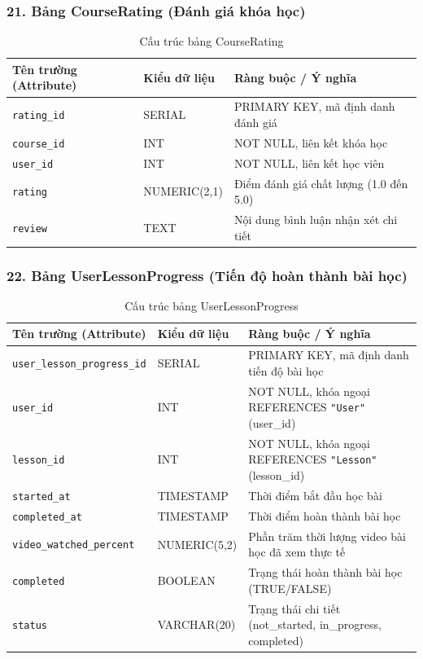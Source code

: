 \documentclass[../DoAn.tex]{subfiles}
\begin{document}
\subsubsection*{21. Bảng CourseRating (Đánh giá khóa học)}
\begin{table}[H]
\centering
\footnotesize
\renewcommand{\arraystretch}{1.2}
\begin{tabular}{|p{4.2cm}|p{3.2cm}|p{7.1cm}|}
\hline
\textbf{Tên trường (Attribute)} & \textbf{Kiểu dữ liệu} & \textbf{Ràng buộc / Ý nghĩa} \\
\hline
\texttt{rating\_id} & SERIAL & PRIMARY KEY, mã định danh đánh giá \\
\hline
\texttt{course\_id} & INT & NOT NULL, liên kết khóa học \\
\hline
\texttt{user\_id} & INT & NOT NULL, liên kết học viên \\
\hline
\texttt{rating} & NUMERIC(2,1) & Điểm đánh giá chất lượng (1.0 đến 5.0) \\
\hline
\texttt{review} & TEXT & Nội dung bình luận nhận xét chi tiết \\
\hline
\end{tabular}
\caption{Cấu trúc bảng CourseRating}
\label{tab:schema_courserating}
\end{table}

\subsubsection*{22. Bảng UserLessonProgress (Tiến độ hoàn thành bài học)}
\begin{table}[H]
\centering
\footnotesize
\renewcommand{\arraystretch}{1.2}
\begin{tabular}{|p{4.2cm}|p{3.2cm}|p{7.1cm}|}
\hline
\textbf{Tên trường (Attribute)} & \textbf{Kiểu dữ liệu} & \textbf{Ràng buộc / Ý nghĩa} \\
\hline
\texttt{user\_lesson\_progress\_id} & SERIAL & PRIMARY KEY, mã định danh tiến độ bài học \\
\hline
\texttt{user\_id} & INT & NOT NULL, khóa ngoại REFERENCES \texttt{"User"}(user\_id) \\
\hline
\texttt{lesson\_id} & INT & NOT NULL, khóa ngoại REFERENCES \texttt{"Lesson"}(lesson\_id) \\
\hline
\texttt{started\_at} & TIMESTAMP & Thời điểm bắt đầu học bài \\
\hline
\texttt{completed\_at} & TIMESTAMP & Thời điểm hoàn thành bài học \\
\hline
\texttt{video\_watched\_percent} & NUMERIC(5,2) & Phần trăm thời lượng video bài học đã xem thực tế \\
\hline
\texttt{completed} & BOOLEAN & Trạng thái hoàn thành bài học (TRUE/FALSE) \\
\hline
\texttt{status} & VARCHAR(20) & Trạng thái chi tiết (not\_started, in\_progress, completed) \\
\hline
\end{tabular}
\caption{Cấu trúc bảng UserLessonProgress}
\label{tab:schema_userlessonprogress}
\end{table}
\end{document}
